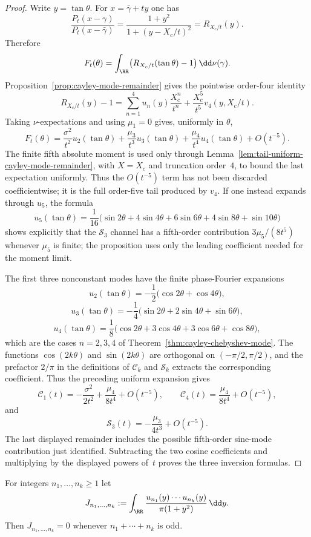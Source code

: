 \begin{proof}
Write $y=\tan\theta$.  For $x=\bar{\gamma}+ty$ one has
\[
\frac{P_t(x-\gamma)}{P_t(x-\bar{\gamma})}
=\frac{1+y^2}{1+(y-X_c/t)^2}
=R_{X_c/t}(y).
\]
Therefore
\[
F_t(\theta)=\int_{\RR}\bigl(R_{X_c/t}(\tan\theta)-1\bigr)
\,\dd\nu(\gamma).
\]
Proposition~\ref{prop:cayley-mode-remainder} gives the pointwise
order-four identity
\[
R_{X_c/t}(y)-1
=\sum_{n=1}^{4}u_n(y)\frac{X_c^n}{t^n}
+\frac{X_c^5}{t^5}v_4(y,X_c/t).
\]
Taking $\nu$-expectations and using $\mu_1=0$ gives, uniformly in
$\theta$,
\[
F_t(\theta)
=\frac{\sigma^2}{t^2}u_2(\tan\theta)
+\frac{\mu_3}{t^3}u_3(\tan\theta)
+\frac{\mu_4}{t^4}u_4(\tan\theta)
+O(t^{-5}).
\]
The finite fifth absolute moment is used only through
Lemma~\ref{lem:tail-uniform-cayley-mode-remainder}, with $X=X_c$ and
truncation order~$4$, to bound the last expectation uniformly.
Thus the $O(t^{-5})$ term has not been discarded coefficientwise; it is the
full order-five tail produced by $v_4$.  If one instead expands through
$u_5$, the formula
\[
u_5(\tan\theta)=\frac1{16}\bigl(\sin2\theta+4\sin4\theta
+6\sin6\theta+4\sin8\theta+\sin10\theta\bigr)
\]
shows explicitly that the $\mathcal S_3$ channel has a fifth-order
contribution $3\mu_5/(8t^5)$ whenever $\mu_5$ is finite; the proposition uses
only the leading coefficient needed for the moment limit.

The first three nonconstant modes have the finite phase-Fourier
expansions
\[
u_2(\tan\theta)=-\frac12\bigl(\cos2\theta+\cos4\theta\bigr),
\]
\[
u_3(\tan\theta)
=-\frac14\bigl(\sin2\theta+2\sin4\theta+\sin6\theta\bigr),
\]
\[
u_4(\tan\theta)
=\frac18\bigl(\cos2\theta+3\cos4\theta+3\cos6\theta+\cos8\theta\bigr),
\]
which are the cases $n=2,3,4$ of
Theorem~\ref{thm:cayley-chebyshev-mode}.  The functions
$\cos(2k\theta)$ and $\sin(2k\theta)$ are orthogonal on
$(-\pi/2,\pi/2)$, and the prefactor $2/\pi$ in the definitions of
$\mathcal C_k$ and $\mathcal S_k$ extracts the corresponding coefficient.
Thus the preceding uniform expansion gives
\[
\mathcal C_1(t)
=-\frac{\sigma^2}{2t^2}+\frac{\mu_4}{8t^4}+O(t^{-5}),
\qquad
\mathcal C_4(t)=\frac{\mu_4}{8t^4}+O(t^{-5}),
\]
and
\[
\mathcal S_3(t)=-\frac{\mu_3}{4t^3}+O(t^{-5}).
\]
The last displayed remainder includes the possible fifth-order sine-mode
contribution just identified.
Subtracting the two cosine coefficients and multiplying by the displayed
powers of~$t$ proves the three inversion formulas.
\end{proof}

\begin{lemma}\label{lem:mode-parity-vanish}
For integers $n_1,\dots,n_k\ge 1$ let
\[
J_{n_1,\dots,n_k}:=
\int_{\RR}
\frac{u_{n_1}(y)\cdots u_{n_k}(y)}{\pi(1+y^2)}\,\dd y.
\]
Then $J_{n_1,\dots,n_k}=0$ whenever $n_1+\cdots+n_k$ is odd.
\end{lemma}

